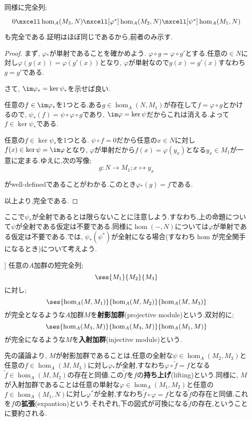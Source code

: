 同様に完全列;
\[\begin{tikzcd}
0\nxcell\hom_A(M_3,N)\nxcell[\varphi^\ast]\hom_A(M_2,N)\nxcell[\psi^\ast]\hom_A(M_1,N)
\end{tikzcd}\]
も完全である.証明はほぼ同じであるから,前者のみ示す.
\begin{proof}
	まず, $\varphi{}_\ast $が単射であることを確かめよう. $\varphi\circ g=\varphi\circ g'$とする.任意の$\in N$に対し$\varphi(g(x))=\varphi(g'(x))$となり, $\varphi$が単射なので$g(x)=g'(x)$すなわち$g=g'$である.
	
	さて, $\im\varphi{}_\ast =\ker\psi_\ast $を示せば良い.
	\begin{mrkw}
		\item 
		任意の$f\in\im\varphi_\ast$を1つとる.ある$g\in\hom_A(N,M_1)$が存在して$f=\varphi\circ g$とかけるので, $\psi_\ast (f)=\psi\circ\varphi\circ g$であり, $\im\varphi=\ker\psi$だからこれは消える.よって$f\in\ker\psi_\ast $である.
		\item 
		任意の$f\in\ker\psi_\ast $を1つとる. $\psi\circ f=0$だから任意の$x\in N$に対し$f(x)\in\ker\psi=\im\varphi$となり, $\varphi$が単射だから$f(x)=\varphi(y_x)$となる$y_x\in M_1$が一意に定まる.ゆえに,次の写像;
		\[g:N\to M_1;x\mapsto y_x\]
		
		がwell-definedであることがわかる.このとき$\varphi{}_\ast (g)=f$である.
	\end{mrkw}
	以上より,完全である.
\end{proof}

ここで$\psi_\ast $が全射であるとは限らないことに注意しよう.すなわち,上の命題について$\psi$が全射である仮定は不要である.同様に$\hom(-,N)$については$\varphi$が単射である仮定は不要である.では, $\psi_\ast(\psi^\ast)$が全射になる場合(すなわち$\hom$が完全関手になるとき)について考えよう.
\begin{defi}
	]
	任意の$A$加群の短完全列;
	\[\ses{M_1}{M_2}{M_3}\]
	に対し;
	\[\ses{\hom_A(M,M_1)}{\hom_A(M,M_2)}{\hom_A(M,M_3)}\]
	が完全となるような$A$加群$M$を\textbf{射影加群}(projective module)という.双対的に;
	\[\ses{\hom_A(M_3,M)}{\hom_A(M_3,M)}{\hom_A(M_1,M)}\]
	が完全になるような$M$を\textbf{入射加群}(injective module)という.
\end{defi}

先の議論より, $M$が射影加群であることは,任意の全射な$\psi\in\hom_A(M_2,M_3)$と任意の$f\in\hom_A(M,M_3)$に対し$\varphi{}_\ast $が全射,すなわち$\varphi\circ\widetilde{f}=f$となる$\widetilde{f}\in\hom_A(M,M_2)$の存在と同値.この$\widetilde{f}$を$f$の\textbf{持ち上げ}(lifting)という.同様に, $M$が入射加群であることは任意の単射な$\varphi\in\hom_A(M_1,M_2)$と任意の$f\in\hom_A(M_1,N)$に対し$\varphi^\ast $が全射,すなわち$\widetilde{f}\circ\varphi=f$となる$\widetilde{f}$の存在と同値.これを$f$の\textbf{拡張}(expantion)という.それぞれ,下の図式が可換になる$\widetilde{f}$の存在,ということに要約される.

